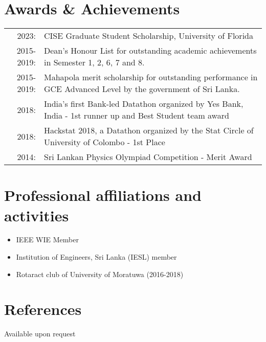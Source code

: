 \documentclass[a4paper,11pt]{article}
\begin{document}
\section{Awards \& Achievements}
\begin{tabular}{rp{16cm}}
2023:& {CISE Graduate Student Scholarship, University of Florida}\\
 2015-2019:&  {Dean's Honour List for outstanding academic achievements in Semester 1, 2, 6, 7 and 8.}\\2015-2019:&  {Mahapola merit scholarship for outstanding performance in GCE Advanced Level by the government} {of Sri Lanka.}\\2018:& {India's first Bank-led Datathon organized by Yes Bank, India - 1st runner up and Best Student team award}\\
2018:& {Hackstat 2018, a Datathon organized by the Stat Circle of University of Colombo - 1st Place}\\2014:& {Sri Lankan Physics Olympiad Competition - Merit Award}\\
\end{tabular}

\bigskip


\section{Professional affiliations and activities}
\begin{itemize}
\setlength\itemsep{0.01em}
  \item IEEE WIE Member
  \item Institution of Engineers, Sri Lanka (IESL) member
  \item Rotaract club of University of Moratuwa (2016-2018)
\end{itemize}

\section{References}

\hspace{-5.2in}Available upon request \hfill
\end{document}
